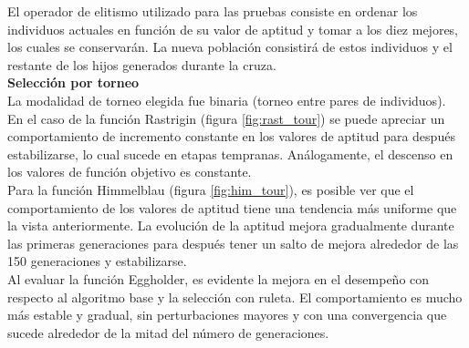 \documentclass[letterpaper,12pt]{article}
\theoremstyle{definition}
\begin{document}
El operador de elitismo utilizado para las pruebas consiste en ordenar los individuos actuales en función de su valor de aptitud y tomar a los diez mejores, los cuales se conservarán. La nueva población consistirá de estos individuos y el restante de los hijos generados durante la cruza. \\

\textbf{Selección por torneo}\\

La modalidad de torneo elegida fue binaria (torneo entre pares de individuos). \\


En el caso de la función Rastrigin (figura \ref{fig:rast_tour}) se puede apreciar un comportamiento de incremento constante en los valores de aptitud para después estabilizarse, lo cual sucede en etapas tempranas. Análogamente, el descenso en los valores de función objetivo es constante.\\

Para la función Himmelblau (figura \ref{fig:him_tour}), es posible ver que el comportamiento de los valores de aptitud tiene una tendencia más uniforme que la vista anteriormente. La evolución de la aptitud mejora gradualmente durante las primeras generaciones para después tener un salto de mejora alrededor de las 150 generaciones y estabilizarse.\\

Al evaluar la función Eggholder, es evidente la mejora en el desempeño con respecto al algoritmo base y la selección con ruleta. El comportamiento es mucho más estable y gradual, sin perturbaciones mayores y con una convergencia que sucede alrededor de la mitad del número de generaciones.
\end{document}

